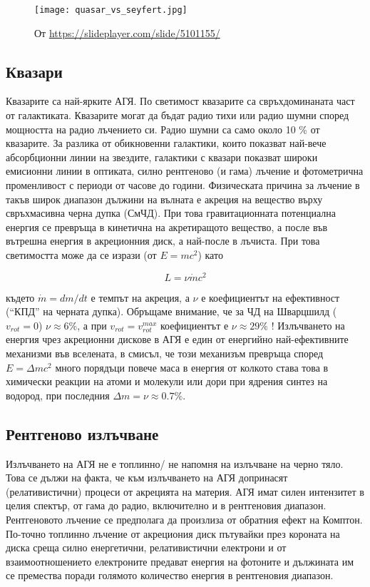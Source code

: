 \documentclass[a4paper,12pt]{article}
\begin{document}
\begin{figure}[h!]
\centering
\texttt{[image: quasar\_vs\_seyfert.jpg]}
\caption{От \url{https://slideplayer.com/slide/5101155/}}
\label{fig:quasar_vs_seyfert}
\end{figure}

\subsection{Квазари}
 Квазарите са най-ярките АГЯ. По светимост квазарите са свръхдоминаната част от галактиката. Квазарите могат да бъдат радио тихи или радио шумни според мощността на радио лъчението си. Радио шумни са само около 10 \%  от квазарите. За разлика от обикновенни галактики, които показват най-вече абсорбционни линии на звездите, галактики с квазари показват широки емисионни линии в оптиката, силно рентгеново (и гама) лъчение и фотометрична променливост с периоди от часове до години. Физическата причина за лъчение в такъв широк диапазон дължини на вълната е акреция на вещество върху свръхмасивна черна дупка (СмЧД). При това гравитационната потенциална енергия се превръща в кинетична на акретиращото вещество, а после във вътрешна енергия в акреционния диск, а най-после в лъчиста. При това светимостта може да се изрази (от $E=mc^2$) като

\begin{equation}
L=\nu \dot{m} c^2
\end{equation}

където $\dot{m}=dm/dt$  е темпът на акреция, а $\nu$ е коефициентът на ефективност (``КПД'' на черната дупка). Обръщаме внимание, че за ЧД на Шварцшилд ($v_{rot}=0$) $\nu \approx 6 \%$, а при $v_{rot}=v_{rot}^{max}$ коефициентът е $\nu \approx 29 \%$ ! Излъчването на енергия чрез акреционни дискове в АГЯ е един от енергийно най-ефективните механизми във вселената, в смисъл, че този механизъм превръща според $E=\Delta m c^2$ много порядъци повече маса в енергия от колкото става това в химически реакции на атоми и молекули или дори при ядрения синтез на водород, при последния $\Delta m = \nu \approx 0.7 \%$.\\
 
\subsection{Рентгеново излъчване}
Излъчването на АГЯ не е топлинно/ не напомня на излъчване на черно тяло. Това се дължи на факта, че към излъчването на АГЯ допринасят (релативистични) процеси от акрецията на материя. АГЯ имат силен интензитет в целия спектър, от гама до радио, включително и в рентгеновия диапазон. Рентгеновото лъчение се предполага да произлиза от обратния ефект на Комптон. По-точно топлинно лъчение от акрециония диск пътувайки през короната на диска среща силно енергетични, релативистични електрони и от взаимоотношението електроните предават енергия на фотоните и дължината им се премества поради голямото количество енергия в рентгеновия диапазон.
 
\end{document}
